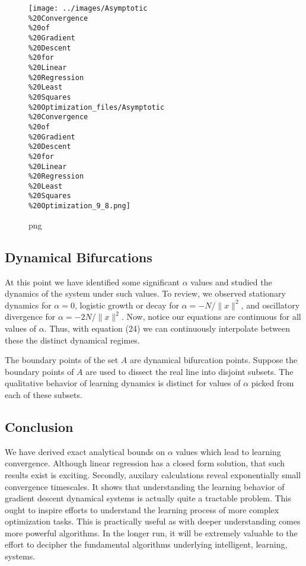 \documentclass[]{article}
\begin{document}
\begin{figure}[htbp]
\centering
\texttt{[image: ../images/Asymptotic\\\%20Convergence\\\%20of\\\%20Gradient\\\%20Descent\\\%20for\\\%20Linear\\\%20Regression\\\%20Least\\\%20Squares\\\%20Optimization\_files/Asymptotic\\\%20Convergence\\\%20of\\\%20Gradient\\\%20Descent\\\%20for\\\%20Linear\\\%20Regression\\\%20Least\\\%20Squares\\\%20Optimization\_9\_8.png]}
\caption{png}
\end{figure}

\subsection{Dynamical Bifurcations}\label{dynamical-bifurcations}

At this point we have identified some significant \(\alpha\) values and
studied the dynamics of the system under such values. To review, we
observed stationary dynamics for \(\alpha=0\), logistic growth or decay
for \(\alpha = -N/{\| x \|^2}\), and oscillatory divergence for
\(\alpha = -2N/{\|x\|^2}\). Now, notice our equations are continuous for
all values of \(\alpha\). Thus, with equation (24) we can continuously
interpolate between these the distinct dynamical regimes.

The boundary points of the set \(A\) are dynamical bifurcation points.
Suppose the boundary points of \(A\) are used to dissect the real line
into disjoint subsets. The qualitative behavior of learning dynamics is
distinct for values of \(\alpha\) picked from each of these subsets.

\subsection{Conclusion}\label{conclusion}

We have derived exact analytical bounds on \(\alpha\) values which lead
to learning convergence. Although linear regression has a closed form
solution, that such results exist is exciting. Secondly, auxilary
calculations reveal exponentially small convergence timescales. It shows
that understanding the learning behavior of gradient descent dynamical
systems is actually quite a tractable problem. This ought to inspire
efforts to understand the learning process of more complex optimization
tasks. This is practically useful as with deeper understanding comes
more powerful algorithms. In the longer run, it will be extremely
valuable to the effort to decipher the fundamental algorithms underlying
intelligent, learning, systems.
\end{document}
